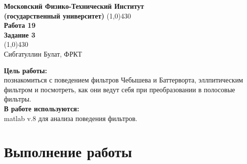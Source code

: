 \documentclass[a4paper, 12pt]{article}%
\begin{document}
\begin{titlepage}

\begin{center}
\large\textbf{Московский Физико-Технический Институт}\\
\large\textbf{(государственный университет)}
\vfill
\line(1,0){430}\\[1mm]
\huge\textbf{Работа 19}\\
\huge\textbf{Задание 3}\\
\line(1,0){430}\\[1mm]
\vfill
\large Сибгатуллин Булат, ФРКТ\\
\end{center}

\end{titlepage}
\noindent \textbf{Цель работы:} \\
\indent познакомиться с поведением фильтров Чебышева и Баттерворта, эллпитическим фильтром и посмотреть, как они ведут себя при преобразовании в полосовые фильтры.\\
\noindent \textbf{В работе используются:} \\
\indent matlab v.8 для анализа поведения фильтров.

\section*{Выполнение работы}
\end{document}
